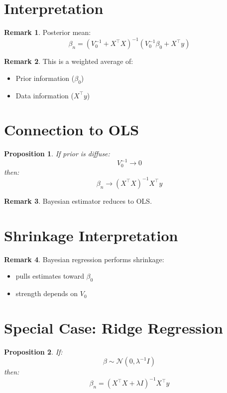 \documentclass[12pt,oneside]{book}
\numberwithin{equation}{section}
\theoremstyle{definition}
\newtheorem{remark}{Remark}[section]
\theoremstyle{plain}
\newtheorem{proposition}{Proposition}[section]
\theoremstyle{remark}
\newcommand{\Normal}{\mathcal{N}}
\begin{document}
\section{Interpretation}

\begin{remark}
Posterior mean:
$$
\beta_n =
(V_0^{-1} + X^\top X)^{-1}
(V_0^{-1}\beta_0 + X^\top y)
$$
\end{remark}

\begin{remark}
This is a weighted average of:
\begin{itemize}
\item Prior information ($\beta_0$)
\item Data information ($X^\top y$)
\end{itemize}
\end{remark}

\section{Connection to OLS}

\begin{proposition}
If prior is diffuse:
$$
V_0^{-1} \to 0
$$
then:
$$
\beta_n \to (X^\top X)^{-1} X^\top y
$$
\end{proposition}

\begin{remark}
Bayesian estimator reduces to OLS.
\end{remark}

\section{Shrinkage Interpretation}

\begin{remark}
Bayesian regression performs shrinkage:
\begin{itemize}
\item pulls estimates toward $\beta_0$
\item strength depends on $V_0$
\end{itemize}
\end{remark}

\section{Special Case: Ridge Regression}

\begin{proposition}
If:
$$
\beta \sim \Normal(0, \lambda^{-1} I)
$$
then:
$$
\beta_n = (X^\top X + \lambda I)^{-1} X^\top y
$$
\end{proposition}
\end{document}
